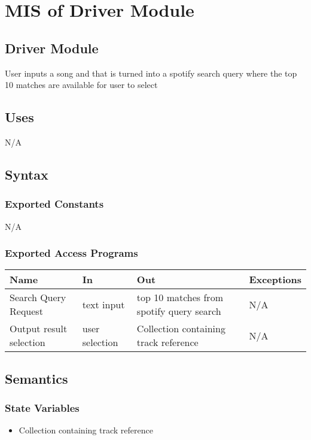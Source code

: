 \documentclass[12pt, titlepage]{article}
\begin{document}
\section{MIS of Driver Module} 

\subsection{Driver Module}
User inputs a song and that is turned into a spotify search query where the top 10 matches are available for user to select

\subsection{Uses}
N/A

\subsection{Syntax}

\subsubsection{Exported Constants}
N/A

\subsubsection{Exported Access Programs}

\begin{center}
\begin{tabular}{p{2cm} p{4cm} p{4cm} p{2cm}}
\hline
\textbf{Name} & \textbf{In} & \textbf{Out} & \textbf{Exceptions}\\
\hline%
Search Query Request &text input &top 10 matches from spotify query search &N/A\\
Output result selection &user selection &Collection containing track reference &N/A\\
\hline
\end{tabular}
\end{center}

\subsection{Semantics}

\subsubsection{State Variables}
\begin{itemize}
  \item Collection containing track reference
\end{itemize}
\end{document}
